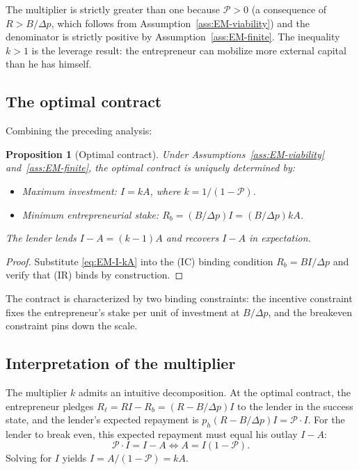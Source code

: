 \documentclass[11pt,a4paper,oneside]{book}
\theoremstyle{plain}
\newtheorem{proposition}[theorem]{Proposition}
\theoremstyle{definition}
\theoremstyle{remark}
\numberwithin{equation}{chapter}
\begin{document}
The multiplier is strictly greater than one because $\mathcal{P} > 0$ (a consequence of $R > B/\Delta p$, which follows from Assumption~\ref{ass:EM-viability}) and the denominator is strictly positive by Assumption~\ref{ass:EM-finite}.
The inequality $k > 1$ is the leverage result: the entrepreneur can mobilize more external capital than he has himself.

\subsection{The optimal contract}

Combining the preceding analysis:

\begin{proposition}[Optimal contract]\label{prop:EM-optimal-contract}
Under Assumptions~\ref{ass:EM-viability} and~\ref{ass:EM-finite}, the optimal contract is uniquely determined by:
\begin{itemize}
  \item \emph{Maximum investment}: $I = k A$, where $k = 1/(1 - \mathcal{P})$.
  \item \emph{Minimum entrepreneurial stake}: $R_b = (B/\Delta p) I = (B/\Delta p) k A$.
\end{itemize}
The lender lends $I - A = (k - 1) A$ and recovers $I - A$ in expectation.
\end{proposition}

\begin{proof}
Substitute \eqref{eq:EM-I-kA} into the (IC) binding condition $R_b = B I / \Delta p$ and verify that (IR) binds by construction.
\end{proof}

The contract is characterized by two binding constraints: the incentive constraint fixes the entrepreneur's stake per unit of investment at $B/\Delta p$, and the breakeven constraint pins down the scale.

\subsection{Interpretation of the multiplier}

The multiplier $k$ admits an intuitive decomposition.
At the optimal contract, the entrepreneur pledges $R_\ell = R I - R_b = (R - B/\Delta p) I$ to the lender in the success state, and the lender's expected repayment is $p_h (R - B/\Delta p) I = \mathcal{P} \cdot I$.
For the lender to break even, this expected repayment must equal his outlay $I - A$:
\begin{equation*}
  \mathcal{P} \cdot I = I - A \Longleftrightarrow A = I (1 - \mathcal{P}).
\end{equation*}
Solving for $I$ yields $I = A/(1 - \mathcal{P}) = k A$.
\end{document}
